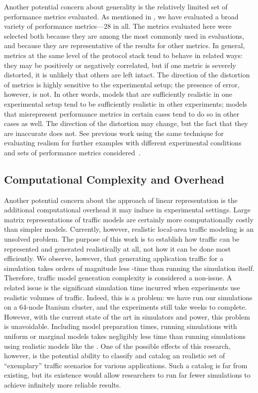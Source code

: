 \documentclass[twocolumn,final]{svjour3}
\begin{document}
Another potential concern about generality is the relatively limited set of performance metrics evaluated.
As mentioned in , we have evaluated a broad variety of performance metrics---28 in all.
The metrics evaluated here were selected both because they are among the most commonly used in evaluations, and because they are representative of the results for other metrics.
In general, metrics at the same level of the protocol stack tend to behave in related ways:
they may be positively or negatively correlated, but if one metric is severely distorted, it is unlikely that others are left intact.
The direction of the distortion of metrics is highly sensitive to the experimental setup;
the presence of error, however, is not.
In other words, models that are sufficiently realistic in one experimental setup tend to be sufficiently realistic in other experiments;
models that misrepresent performance metrics in certain cases tend to do so in other cases as well.
The direction of the distortion may change, but the fact that they are inaccurate does not.
See previous work using the same technique for evaluating realism for further examples with different experimental conditions and sets of performance metrics considered~\cite{Karpinski07:realism,Karpinski07:cbr-failure}.

\subsection{Computational Complexity and Overhead}

Another potential concern about the approach of linear representation is the additional computational overhead it may induce in experimental settings.
Large matrix representations of traffic models are certainly more computationally costly than simpler models.
Currently, however, realistic local-area traffic modeling is an unsolved problem.
The purpose of this work is to establish how traffic can be represented and generated realistically at all, not how it can be done most efficiently.
We observe, however, that generating application traffic for a simulation takes orders of magnitude less -time than running the simulation itself.
Therefore, traffic model generation complexity is considered a non-issue.
A related issue is the significant simulation time incurred when experiments use realistic volumes of traffic.
Indeed, this is a problem:
we have run our simulations on a 64-node Itanium cluster, and the experiments still take weeks to complete.
However, with the current state of the art in simulators and  power, this problem is unavoidable.
Including model preparation times, running simulations with uniform or marginal models takes negligibly less time than running simulations using realistic models like the .
One of the possible effects of this research, however, is the potential ability to classify and catalog an realistic set of ``exemplary'' traffic scenarios for various applications.
Such a catalog is far from existing, but its existence would allow researchers to run far fewer simulations to achieve infinitely more reliable results.
\end{document}
